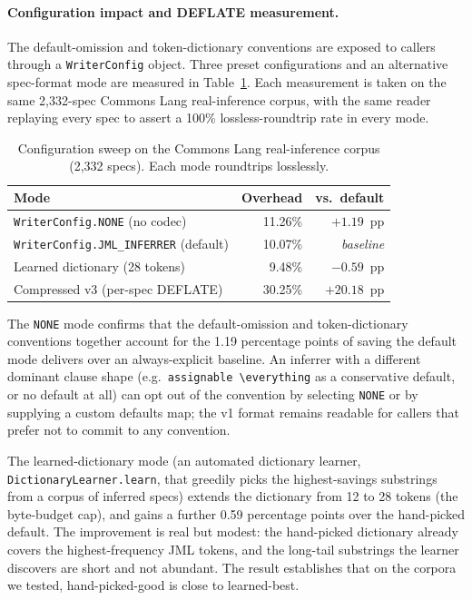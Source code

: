 \paragraph{Configuration impact and DEFLATE measurement.}
The default-omission and token-dictionary conventions are exposed to callers through a \texttt{WriterConfig} object. Three preset configurations and an alternative spec-format mode are measured in Table~\ref{tab:configs}. Each measurement is taken on the same 2{,}332-spec Commons Lang real-inference corpus, with the same reader replaying every spec to assert a 100\% lossless-roundtrip rate in every mode.

\begin{table}[ht]
\centering
\caption{Configuration sweep on the Commons Lang real-inference corpus (2{,}332 specs). Each mode roundtrips losslessly.}
\label{tab:configs}
\setlength{\tabcolsep}{3pt}
\footnotesize
\begin{tabular}{lrr}
\toprule
\textbf{Mode} & \textbf{Overhead} & \textbf{vs.\ default} \\
\midrule
\texttt{WriterConfig.NONE} (no codec)         & 11.26\% & $+1.19$~pp \\
\texttt{WriterConfig.JML\_INFERRER} (default) & 10.07\% & \emph{baseline} \\
Learned dictionary (28 tokens)                & \phantom{0}9.48\% & $-0.59$~pp \\
Compressed v3 (per-spec DEFLATE)              & 30.25\% & $+20.18$~pp \\
\bottomrule
\end{tabular}
\end{table}

The \texttt{NONE} mode confirms that the default-omission and token-dictionary conventions together account for the 1.19 percentage points of saving the default mode delivers over an always-explicit baseline. An inferrer with a different dominant clause shape (e.g.\ \texttt{assignable \textbackslash everything} as a conservative default, or no default at all) can opt out of the convention by selecting \texttt{NONE} or by supplying a custom defaults map; the v1 format remains readable for callers that prefer not to commit to any convention.

The learned-dictionary mode (an automated dictionary learner, \texttt{DictionaryLearner.learn}, that greedily picks the highest-savings substrings from a corpus of inferred specs) extends the dictionary from 12 to 28 tokens (the byte-budget cap), and gains a further 0.59 percentage points over the hand-picked default. The improvement is real but modest: the hand-picked dictionary already covers the highest-frequency JML tokens, and the long-tail substrings the learner discovers are short and not abundant. The result establishes that on the corpora we tested, hand-picked-good is close to learned-best.

